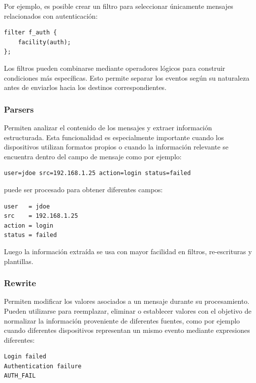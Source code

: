 Por ejemplo, es posible crear un filtro para seleccionar únicamente mensajes relacionados con autenticación:

\begin{lstlisting}[style=logstyle]
filter f_auth {
    facility(auth);
};
\end{lstlisting}

Los filtros pueden combinarse mediante operadores lógicos para construir condiciones más específicas. Esto permite separar los eventos según su naturaleza antes de enviarlos hacia los destinos correspondientes.

\subsubsection{Parsers}
Permiten analizar el contenido de los mensajes y
extraer información estructurada. Esta funcionalidad es especialmente importante cuando los dispositivos utilizan formatos propios o cuando la información relevante se encuentra dentro del campo de mensaje como por ejemplo:

\begin{lstlisting}[style=logstyle]
user=jdoe src=192.168.1.25 action=login status=failed
\end{lstlisting}

puede ser procesado para obtener diferentes campos:

\begin{lstlisting}[style=logstyle]
user   = jdoe
src    = 192.168.1.25
action = login
status = failed
\end{lstlisting}

Luego la información extraída se usa con mayor facilidad en filtros, re-escrituras y plantillas.

\subsubsection{Rewrite}

Permiten modificar los valores asociados a un mensaje durante su procesamiento. Pueden utilizarse para reemplazar,
eliminar o establecer valores con el objetivo de normalizar la información proveniente de diferentes fuentes, como por ejemplo cuando diferentes dispositivos representan un mismo evento mediante expresiones diferentes:

\begin{lstlisting}[style=logstyle]
Login failed
Authentication failure
AUTH_FAIL
\end{lstlisting}

